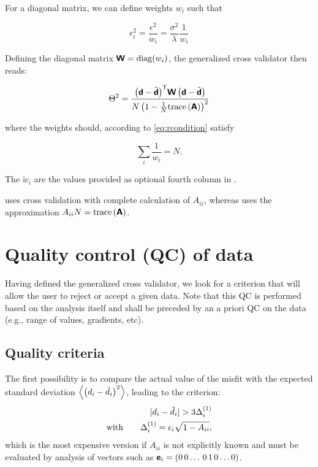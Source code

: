 For a diagonal matrix, we can define weights $w_i$ such that

\begin{equation}
\epsilon^2_i = \frac{\epsilon^2}{w_i}= \frac{\sigma^2}{\lambda}\frac{1}{w_i}
\end{equation}

Defining the diagonal matrix $\mbox{\boldmath $ \protect\mathsf{W} $} = \mbox{diag}(w_i)$, the generalized cross validator then reads:

\begin{equation}
\Theta^2=\frac{ {\left(\mbox{\boldmath $ \protect\mathsf{d} $}-\tilde{\mbox{\boldmath $ \protect\mathsf{d} $}}\right)}^\mathsf{T} \mbox{\boldmath $ \protect\mathsf{W} $} \left(\mbox{\boldmath $ \protect\mathsf{d} $}-\tilde{\mbox{\boldmath $ \protect\mathsf{d} $}}\right) }{ N \left(1 - \frac{1}{N}\mathrm{trace}\left( \mbox{\boldmath $ \protect\mathsf{A} $} \right)\right)^2} 
\label{eq:gcvbis}
\end{equation}

where the weights should, according to \eqref{eq:rcondition} satisfy

\begin{equation}
\sum_i \frac{1 }{w_i} = N.
\label{eq:condition}
\end{equation}

The $\tilde{w}_i$ are the values provided as optional fourth column in .

 uses cross validation with complete calculation of $A_{ii}$, whereas  uses the approximation $A_{ii} N=\mathrm{trace}\left( \mbox{\boldmath $ \protect\mathsf{A} $} \right)$.

\section{Quality control (QC) of data\label{secdivaqc}}

Having defined the generalized cross validator, we look for a criterion that will allow the user to reject or accept a given data. Note that this QC is performed based on the analysis itself and shall be preceded by an a priori QC on the data (e.g., range of values, gradients, etc). 

\subsection{Quality criteria}

The first possibility is to compare the actual value of the misfit with the expected standard deviation $\left\langle \left(d_i - \tilde{d}_i\right)^2 \right\rangle$, leading to the criterion:
\begin{eqnarray}
| d_i - \tilde{d}_i | > 3 \Delta_i^{(1)}\\
\textrm{with}  \qquad \Delta_i^{(1)} = \epsilon_i \sqrt{1-A_{ii}},\label{eq:qc1}
\end{eqnarray}
which is the most expensive version if $A_{ii}$ is not explicitly known and must be evaluated by analysis of vectors such as $\mbox{\boldmath $ \protect\mathsf{e} $}_i=(0\,0\ldots\,0\,1\,0\ldots 0)$. 

